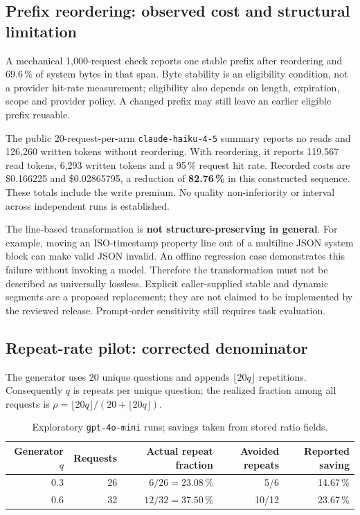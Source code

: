 \documentclass[11pt,a4paper]{article}
\begin{document}
\subsection{Prefix reordering: observed cost and structural limitation}
A mechanical 1{,}000-request check reports one stable prefix after reordering and 69.6\,\% of
system bytes in that span. Byte stability is an eligibility condition, not a provider hit-rate
measurement; eligibility also depends on length, expiration, scope and provider policy. A changed
prefix may still leave an earlier eligible prefix reusable.

The public 20-request-per-arm \texttt{claude-haiku-4-5} summary reports no reads and 126{,}260
written tokens without reordering. With reordering, it reports 119{,}567 read tokens, 6{,}293
written tokens and a 95\,\% request hit rate. Recorded costs are \$0.166225 and \$0.02865795, a
reduction of \textbf{82.76\,\%} in this constructed sequence. These totals include the write
premium. No quality non-inferiority or interval across independent runs is established.

The line-based transformation is \textbf{not structure-preserving in general}. For example,
moving an ISO-timestamp property line out of a multiline JSON system block can make valid JSON
invalid. An offline regression case demonstrates this failure without invoking a model. Therefore
the transformation must not be described as universally lossless. Explicit caller-supplied stable
and dynamic segments are a proposed replacement; they are not claimed to be implemented by the
reviewed release. Prompt-order sensitivity still requires task evaluation.

\subsection{Repeat-rate pilot: corrected denominator}
The generator uses 20 unique questions and appends $\lfloor 20q\rfloor$ repetitions.
Consequently $q$ is repeats per unique question; the realized fraction among all requests is
$\rho=\lfloor 20q\rfloor/(20+\lfloor 20q\rfloor)$.

\begin{table}[h]
\centering
\begin{tabular}{rrrrr}
\toprule
Generator $q$ & Requests & Actual repeat fraction & Avoided repeats & Reported saving \\
\midrule
0.3 & 26 & $6/26=23.08\,\%$ & 5/6 & 14.67\,\% \\
0.6 & 32 & $12/32=37.50\,\%$ & 10/12 & 23.67\,\% \\
\bottomrule
\end{tabular}
\caption{Exploratory \texttt{gpt-4o-mini} runs; savings taken from stored ratio fields.}
\label{tab:rho}
\end{table}
\end{document}

